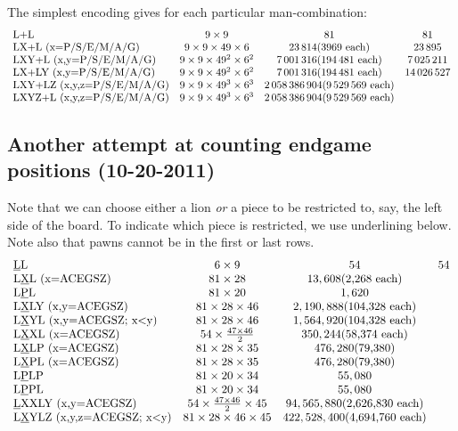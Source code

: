\documentclass[10pt,dvipdfmx,letterpaper]{report}
\let\x=\times
\begin{document}
The simplest encoding gives for each particular man-combination:
\[\begin{array}{lccc}
\text{L+L} & 9\x9 & 81 & 81 \\
\text{LX+L (x=P/S/E/M/A/G)} & 9\x9\x49\x6 & 23\,814 \text{(3969 each)} & 23\,895 \\
\text{LXY+L (x,y=P/S/E/M/A/G)} & 9\x9\x49^2\x6^2 & 7\,001\,316 \text{(194\,481 each)} & 7\,025\,211 \\
\text{LX+LY (x,y=P/S/E/M/A/G)} & 9\x9\x49^2\x6^2 & 7\,001\,316 \text{(194\,481 each)} & 14\,026\,527 \\
\text{LXY+LZ (x,y,z=P/S/E/M/A/G)} & 9\x9\x49^3\x6^3 & 2\,058\,386\,904 \text{(9\,529\,569 each)} \\
\text{LXYZ+L (x,y,z=P/S/E/M/A/G)} & 9\x9\x49^3\x6^3 & 2\,058\,386\,904 \text{(9\,529\,569 each)} \\
\end{array}\]

\subsection{Another attempt at counting endgame positions (10-20-2011)}

Note that we can choose either a lion {\em or} a piece to be restricted to, say, the left side
of the board.  To indicate which piece is restricted, we use underlining below.  Note also that pawns
cannot be in the first or last rows.
\[\begin{array}{lccc}
\text{\underline{L}L} & 6\x9 & 54 & 54 \\
\text{L\underline{X}L (x=ACEGSZ)} & 81\x28 & 13,608 \text{(2,268 each)} &  \\
\text{L\underline{P}L} & 81\x20 & 1,620 &  \\
\text{L\underline{X}LY (x,y=ACEGSZ)} & 81\x28\x46 & 2,190,888 \text{(104,328 each)} & \\
\text{L\underline{X}YL (x,y=ACEGSZ; x<y)} & 81\x28\x46 & 1,564,920 \text{(104,328 each)} & \\
\text{L\underline{X}XL (x=ACEGSZ)} & 54\x\frac{47\x46}{2} & 350,244 \text{(58,374 each)} & \\
\text{L\underline{X}LP (x=ACEGSZ)} & 81\x28\x35 & 476,280 \text{(79,380)} & \\
\text{L\underline{X}PL (x=ACEGSZ)} & 81\x28\x35 & 476,280 \text{(79,380)} & \\
\text{L\underline{P}LP} & 81\x20\x34 & 55,080 & \\
\text{L\underline{P}PL} & 81\x20\x34 & 55,080 & \\
\text{\underline{L}XXLY (x,y=ACEGSZ)} & 54\x\frac{47\x46}{2}\x45 & 94,565,880 \text{(2,626,830 each)} & \\
\text{L\underline{X}YLZ (x,y,z=ACEGSZ; x<y)} & 81\x28\x46\x45 & 422,528,400 \text{(4,694,760 each)} & \\
\end{array}\]
\end{document}
